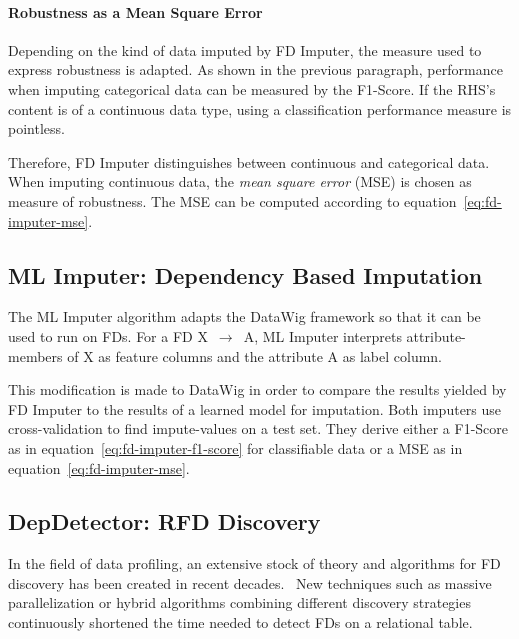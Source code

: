 \paragraph{Robustness as a Mean Square Error}
Depending on the kind of data imputed by FD Imputer, the measure used to express robustness is adapted.
As shown in the previous paragraph, performance when imputing categorical data can be measured by the F1-Score.
If the RHS's content is of a continuous data type, using a classification performance measure is pointless.

Therefore, FD Imputer distinguishes between continuous and categorical data.
When imputing continuous data, the \emph{mean square error} (MSE) is chosen as measure of robustness.
The MSE can be computed according to equation~\ref{eq:fd-imputer-mse}.

\newpage

\subsection{ML Imputer: Dependency Based Imputation}
The ML Imputer algorithm adapts the DataWig framework so that it can be used to run on FDs.
For a FD \textsc{X}~\( \rightarrow \)~\textsc{A}, ML Imputer interprets attribute-members of \textsc{X} as feature columns and the attribute \textsc{A} as label column.

This modification is made to DataWig in order to compare the results yielded by FD Imputer to the results of a learned model for imputation.
Both imputers use cross-validation to find impute-values on a test set.
They derive either a F1-Score as in equation~\ref{eq:fd-imputer-f1-score} for classifiable data or a MSE as in equation~\ref{eq:fd-imputer-mse}.


\subsection{DepDetector: RFD Discovery}
In the field of data profiling, an extensive stock of theory and algorithms for FD discovery has been created in recent decades.~\cite[p.~39]{ABE19}
New techniques such as massive parallelization or hybrid algorithms combining different discovery strategies continuously shortened the time needed to detect FDs on a relational table.~\cite[p.~40]{ABE19}

